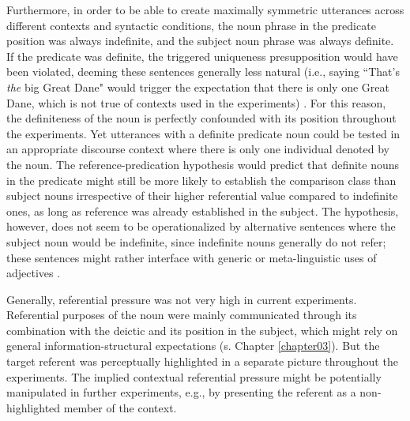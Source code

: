 Furthermore, in order to be able to create maximally symmetric utterances across different contexts and syntactic conditions, the noun phrase in the predicate position was always indefinite, and the subject noun phrase was always definite. If the predicate was definite, the triggered uniqueness presupposition would have been violated, deeming these sentences generally less natural (i.e., saying ``That's \emph{the} big Great Dane" would trigger the expectation that there is only one Great Dane, which is not true of contexts used in the experiments) \parencite[cf.][]{syrett2010meaning}. 
For this reason, the definiteness of the noun is perfectly confounded with its position throughout the experiments. Yet utterances with a definite predicate noun could be tested in an appropriate discourse context where there is only one individual denoted by the noun. The reference-predication hypothesis would predict that definite nouns in the predicate might still be more likely to establish the comparison class than subject nouns irrespective of their higher referential value compared to indefinite ones, as long as reference was already established in the subject. 
The hypothesis, however, does not seem to be operationalized by alternative sentences where the subject noun would be indefinite, since indefinite nouns generally do not refer; these sentences might rather interface with generic or meta-linguistic uses of adjectives \parencite{Reboul2001, tessler2019language, barker2002dynamics}. 

Generally, referential pressure was not very high in current experiments. Referential purposes of the noun were mainly communicated through its combination with the deictic and its position in the subject, which might rely on general information-structural expectations (s. Chapter \ref{chapter03}). But the target referent was perceptually highlighted in a separate picture throughout the experiments. The implied contextual referential pressure might be potentially manipulated in further experiments, e.g., by presenting the referent as a non-highlighted member of the context. 

